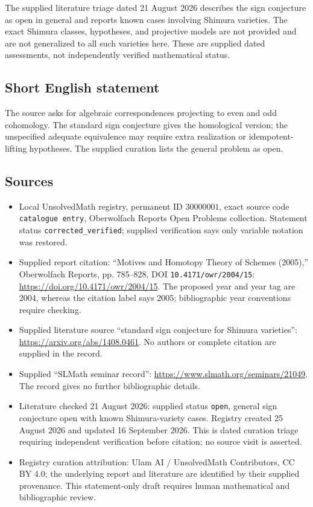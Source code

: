 \documentclass[11pt]{article}
\begin{document}
The supplied literature triage dated 21 August 2026 describes the sign conjecture as open in general and reports known cases involving Shimura varieties. The exact Shimura classes, hypotheses, and projective models are not provided and are not generalized to all such varieties here. These are supplied dated assessments, not independently verified mathematical status.
\subsection{Short English statement}
The source asks for algebraic correspondences projecting to even and odd cohomology. The standard sign conjecture gives the homological version; the unspecified adequate equivalence may require extra realization or idempotent-lifting hypotheses. The supplied curation lists the general problem as open.
\subsection{Sources}
\begin{itemize}
\item Local UnsolvedMath registry, permanent ID \(30000001\), exact source code \texttt{catalogue entry}, Oberwolfach Reports Open Problems collection. Statement status \texttt{corrected\_verified}; supplied verification says only variable notation was restored.
\item Supplied report citation: ``Motives and Homotopy Theory of Schemes (2005),'' Oberwolfach Reports, pp. 785--828, DOI \texttt{10.4171/owr/2004/15}: \url{https://doi.org/10.4171/owr/2004/15}. The proposed year and year tag are 2004, whereas the citation label says 2005; bibliographic year conventions require checking.
\item Supplied literature source ``standard sign conjecture for Shimura varieties'': \url{https://arxiv.org/abs/1408.0461}. No authors or complete citation are supplied in the record.
\item Supplied ``SLMath seminar record'': \url{https://www.slmath.org/seminars/21049}. The record gives no further bibliographic details.
\item Literature checked 21 August 2026: supplied status \texttt{open}, general sign conjecture open with known Shimura-variety cases. Registry created 25 August 2026 and updated 16 September 2026. This is dated curation triage requiring independent verification before citation; no source visit is asserted.
\item Registry curation attribution: Ulam AI / UnsolvedMath Contributors, CC BY 4.0; the underlying report and literature are identified by their supplied provenance. This statement-only draft requires human mathematical and bibliographic review.
\end{itemize}
\end{document}
